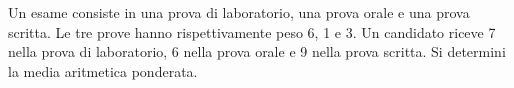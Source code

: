 Un esame consiste in una prova di laboratorio, 
una prova orale e una prova scritta. 
Le tre prove hanno rispettivamente peso 6, 1 e 3. 
Un candidato riceve 7 nella prova di laboratorio, 6 nella 
prova orale e 9 nella prova scritta. 
Si determini la media aritmetica ponderata.
